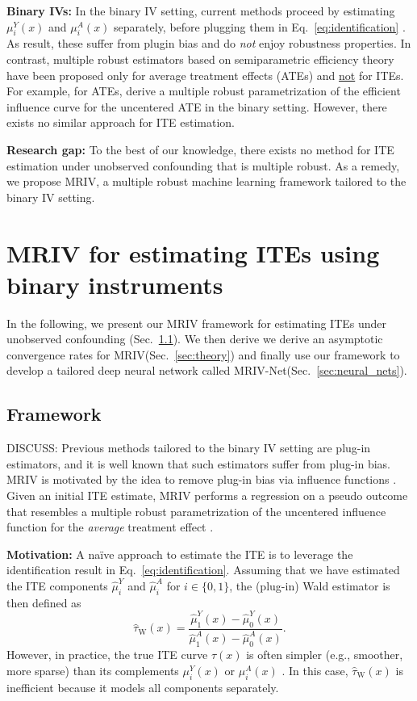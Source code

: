 \documentclass[nonatbib]{article}
\newcommand{\TODO}[1]{{\color{red}#1}}
\newcommand{\frameworkname}{MRIV\xspace}
\newcommand{\modelname}{\mbox{MRIV-Net}\xspace}
\theoremstyle{definition}
\theoremstyle{plain}
\begin{document}
\textbf{Binary IVs:} In the binary IV setting, current methods proceed by estimating $\mu_i^Y(x)$ and $\mu_i^A(x)$ separately, before  plugging them in Eq.~\ref{eq:identification} \cite{Imbens.1994, Angrist.1996, BargagliStoffi.2021}. As result, these suffer from plugin bias and do \emph{not} enjoy robustness properties. In contrast, multiple robust estimators based on semiparametric efficiency theory have been proposed only for average treatment effects (ATEs) and \underline{not} for ITEs. For example, for ATEs, \cite{Wang.2018} derive a multiple robust parametrization of the efficient influence curve for the uncentered ATE in the binary setting. However, there exists no similar approach for ITE estimation.

\textbf{Research gap:} To the best of our knowledge, there exists no method for ITE estimation under unobserved confounding that is multiple robust. As a remedy, we propose \frameworkname, a multiple robust machine learning framework tailored to the binary IV setting.


\section{\frameworkname for estimating ITEs using binary instruments}

In the following, we present our \frameworkname framework for estimating ITEs under unobserved confounding (Sec.~\ref{sec:methodology}). We then derive we derive an asymptotic convergence rates for \frameworkname (Sec.~\ref{sec:theory}) and finally use our framework to develop a tailored deep neural network called \modelname (Sec.~\ref{sec:neural_nets}). 

\subsection{Framework}
\label{sec:methodology}

\TODO{DISCUSS: Previous methods tailored to the binary IV setting are plug-in estimators, and it is well known that such estimators suffer from plug-in bias. \frameworkname is motivated by the idea to remove plug-in bias via influence functions \cite{Curth.2020}. Given an initial ITE estimate, \frameworkname performs a regression on a pseudo outcome that resembles a multiple robust parametrization of the uncentered influence function for the \emph{average} treatment effect \cite{Wang.2018}.}

\textbf{Motivation:} A na{\"i}ve approach to estimate the ITE is to leverage the identification result in Eq.~\eqref{eq:identification}. Assuming that we have estimated the ITE components $\hat{\mu}_i^Y$ and $\hat{\mu}_i^A$ for $i \in \{0,1\}$, the (plug-in) Wald estimator \cite{Wald.1940} is then defined as
\begin{equation}\label{eq:wald}
    \hat{\tau}_{\mathrm{W}}(x) = \frac{\hat{\mu}_1^Y(x) - \hat{\mu}_0^Y(x)}{\hat{\mu}_1^A(x) - \hat{\mu}_0^A(x)}.
\end{equation}
However, in practice, the true ITE curve $\tau(x)$ is often simpler (e.g., smoother, more sparse) than its complements $\mu_i^Y(x)$ or $\mu_i^A(x)$ \cite{Kunzel.2019}. In this case, $\hat{\tau}_{\mathrm{W}}(x)$ is inefficient because it models all components separately.
\end{document}
